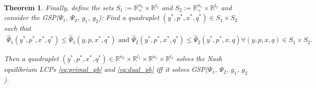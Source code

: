 \documentclass{article} %
\newtheorem{theorem}{Theorem} \newtheorem{lemma}[theorem]{Lemma}
\begin{document}
\begin{theorem}
Finally, define the sets $S_1 := \mathbb{R}^{n_2}_+ \times \mathbb{R}^{l_1}$ and $S_2 :=
\mathbb{R}^{n_1}_+ \times \mathbb{R}^{l_2}$ and consider the
GSP($\Psi_1$, $\Psi_2$, $g_1$, $g_2$): Find a quadruplet $(y^*,p^*, x^*, q^*) \in
S_1 \times S_2$ such that
\begin{eqnarray}
    \hat{\Psi}_1(y^*, p^*, x^*, q^*) \le \hat{\Psi}_1(y, p, x^*,
    q^*) \text{ and }\hat{\Psi}_2(y^*, p^*, x^*, q^*)
    \le \hat{\Psi}_2(y^*, p^*, x, q) \forall (y,p, x, q) \in S_1
    \times S_2.
  \label{eq:unconstrained_pb}
\end{eqnarray}
\label{thm:pd}

Then a quadruplet $(y^*,p^*, x^*, q^*) \in \mathbb{R}^{n_2}
  \times \mathbb{R}^{l_1} \times \mathbb{R}^{n_1} \times
  \mathbb{R}^{l_2}$ solves the Nash equilibrium LCPs
  \eqref{eq:primal_pb} and \eqref{eq:dual_pb} iff it solves
  GSP($\Psi_1$, $\Psi_2$, $g_1$, $g_2$).
  \label{thm:pd}
\end{theorem}
\end{document}
